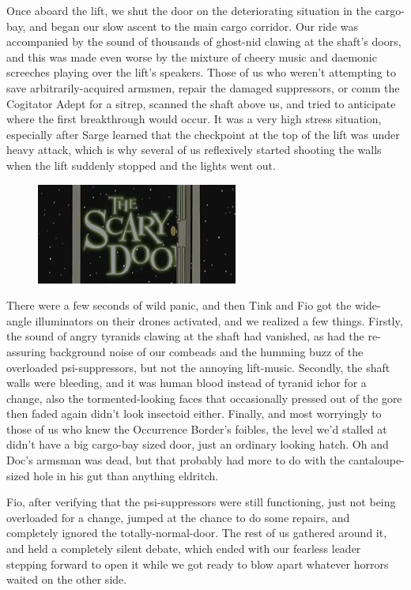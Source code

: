 Once aboard the lift, we shut the door on the deteriorating situation in the cargo-bay, and began our slow ascent to the main cargo corridor. 
Our ride was accompanied by the sound of thousands of ghost-nid clawing at the shaft's doors, and this was made even worse by the mixture of cheery music and daemonic screeches playing over the lift's speakers. 
Those of us who weren't attempting to save arbitrarily-acquired armsmen, repair the damaged suppressors, or comm the Cogitator Adept for a sitrep, scanned the shaft above us, and tried to anticipate where the first breakthrough would occur. 
It was a very high stress situation, especially after Sarge learned that the checkpoint at the top of the lift was under heavy attack, which is why several of us reflexively started shooting the walls when the lift suddenly stopped and the lights went out.

\begin{figure}
	\begin{center}
		\includegraphics[width=\figwidth]{pics/15/58.png}
	\end{center}
\end{figure}
There were a few seconds of wild panic, and then Tink and Fio got the wide-angle illuminators on their drones activated, and we realized a few things. 
Firstly, the sound of angry tyranids clawing at the shaft had vanished, as had the re-assuring background noise of our combeads and the humming buzz of the overloaded psi-suppressors, but not the annoying lift-music. 
Secondly, the shaft walls were bleeding, and it was human blood instead of tyranid ichor for a change, also the tormented-looking faces that occasionally pressed out of the gore then faded again didn't look insectoid either. 
Finally, and most worryingly to those of us who knew the Occurrence Border's foibles, the level we'd stalled at didn't have a big cargo-bay sized door, just an ordinary looking hatch. 
Oh and Doc's armsman was dead, but that probably had more to do with the cantaloupe-sized hole in his gut than anything eldritch.

Fio, after verifying that the psi-suppressors were still functioning, just not being overloaded for a change, jumped at the chance to do some repairs, and completely ignored the totally-normal-door. 
The rest of us gathered around it, and held a completely silent debate, which ended with our fearless leader stepping forward to open it while we got ready to blow apart whatever horrors waited on the other side.

